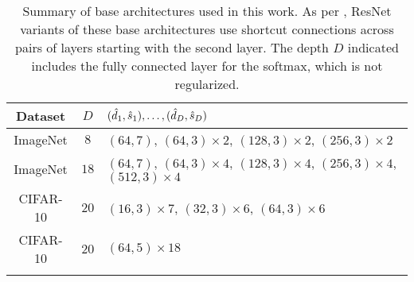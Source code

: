 \begin{table}[!t]
  \centering
  \begin{tabular}{c c >{\centering\arraybackslash}m{} }
    \toprule
    Dataset & $D$ & $(\hat{d}_1, \hat{s}_1), \ldots, (\hat{d}_D, \hat{s}_D)$  \\
    \toprule   
    ImageNet & $8$ & $(64,7)$, $(64,3) \times 2$, $(128,3) \times 2 $, $(256,3) \times 2$ \\
    ImageNet & $18$ &$(64,7)$, $(64,3) \times 4$, $(128,3) \times 4 $, $(256,3) \times 4$, $(512,3) \times 4$ \\
    CIFAR-10 & $20$ & $(16,3) \times 7$, $(32,3) \times 6$, $(64,3) \times 6$\\
    CIFAR-10 & $20$ & $(64,5) \times 18$\\
    \bottomrule\\
  \end{tabular}
  \caption{Summary of base architectures used in this work. As per \cite{resent}, ResNet variants of these base architectures use shortcut connections across pairs of layers starting with the second layer. The depth $D$ indicated includes the fully connected layer for the softmax, which is not regularized. } %
  \label{tbl:base_archs}
\end{table}

